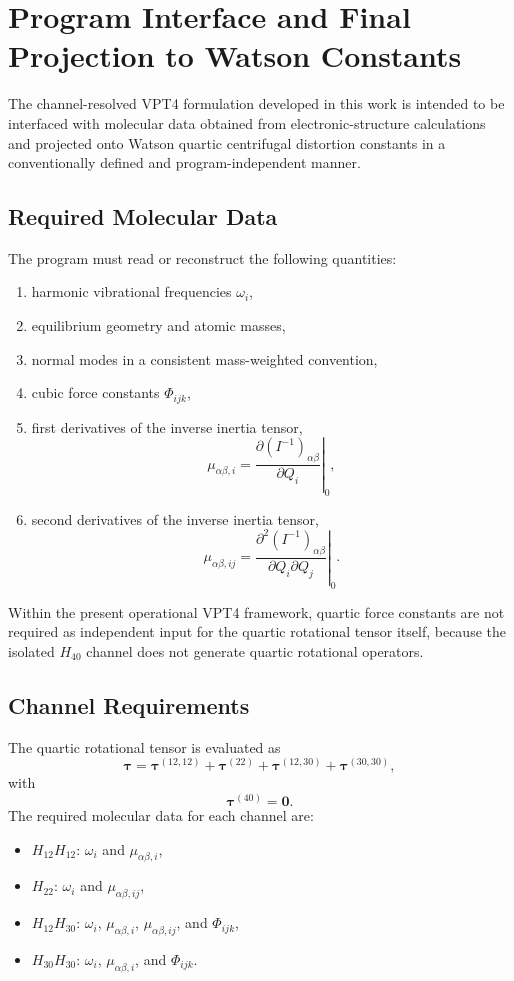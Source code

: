 \documentclass[11pt]{article}
\begin{document}
\section{Program Interface and Final Projection to Watson Constants}
The channel-resolved VPT4 formulation developed in this work is intended to be interfaced with molecular data obtained from electronic-structure calculations and projected onto Watson quartic centrifugal distortion constants in a conventionally defined and program-independent manner.

\subsection{Required Molecular Data}
The program must read or reconstruct the following quantities:
\begin{enumerate}
\item harmonic vibrational frequencies $\omega_i$,
\item equilibrium geometry and atomic masses,
\item normal modes in a consistent mass-weighted convention,
\item cubic force constants $\Phi_{ijk}$,
\item first derivatives of the inverse inertia tensor,
\[
\mu_{\alpha\beta,i}
=
\left.
\frac{\partial (I^{-1})_{\alpha\beta}}{\partial Q_i}
\right|_0,
\]
\item second derivatives of the inverse inertia tensor,
\[
\mu_{\alpha\beta,ij}
=
\left.
\frac{\partial^2 (I^{-1})_{\alpha\beta}}{\partial Q_i \partial Q_j}
\right|_0.
\]
\end{enumerate}

Within the present operational VPT4 framework, quartic force constants are not required as independent input for the quartic rotational tensor itself, because the isolated $H_{40}$ channel does not generate quartic rotational operators.

\subsection{Channel Requirements}
The quartic rotational tensor is evaluated as
\[
\bm{\tau}
=
\bm{\tau}^{(12,12)}
+
\bm{\tau}^{(22)}
+
\bm{\tau}^{(12,30)}
+
\bm{\tau}^{(30,30)},
\]
with
\[
\bm{\tau}^{(40)} = \bm{0}.
\]
The required molecular data for each channel are:
\begin{itemize}
\item $H_{12}H_{12}$: $\omega_i$ and $\mu_{\alpha\beta,i}$,
\item $H_{22}$: $\omega_i$ and $\mu_{\alpha\beta,ij}$,
\item $H_{12}H_{30}$: $\omega_i$, $\mu_{\alpha\beta,i}$, $\mu_{\alpha\beta,ij}$, and $\Phi_{ijk}$,
\item $H_{30}H_{30}$: $\omega_i$, $\mu_{\alpha\beta,i}$, and $\Phi_{ijk}$.
\end{itemize}
\end{document}
